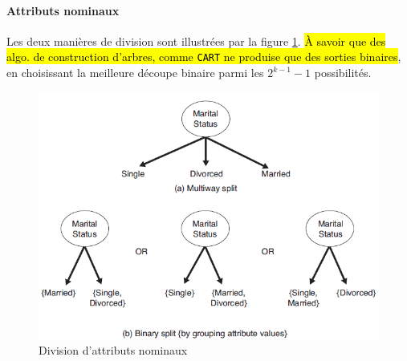 \documentclass[letterpaper, 12pt]{article}
\begin{document}
			\paragraph{Attributs nominaux} Les deux manières de division
				sont illustrées par la figure \ref{fig:tree:nominal}. 
				\hl{\`A savoir que des algo. de construction d'arbres, comme
				\texttt{CART} ne produise que des sorties binaires}, en
				choisissant la meilleure découpe binaire parmi les
				$2^{k-1} -1$ possibilités.\\
				\begin{minipage}{0.45\textwidth}
					\begin{figure}[H]
						\centering
						\includegraphics[scale=0.65]{Images/tree_nominal.png}
						\caption{Division d'attributs nominaux}
						\label{fig:tree:nominal}
					\end{figure}\noindent
				\end{minipage}\hfill
\end{document}
